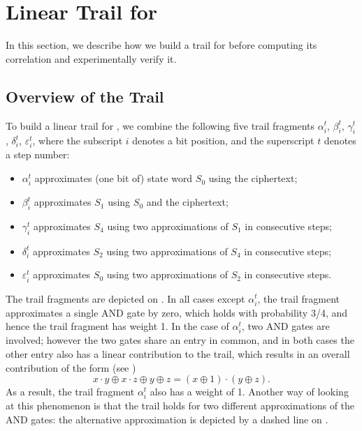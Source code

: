 
\section{Linear Trail for \MiniMORUS}
\label{sec/minitrails}

In this section, we describe how we build a trail for \MiniMORUS before computing its correlation and experimentally verify it.

\subsection{Overview of the Trail}

To build a linear trail for \MiniMORUS, we combine the following five trail fragments $\alpha^t_i$, $\beta^t_i$, $\gamma^t_i$, $\delta^t_i$, $\varepsilon^t_i$, where the subscript $i$ denotes a bit position, and the superscript $t$ denotes a step number:
\begin{itemize}
    \item $\alpha^t_i$ approximates (one bit of) state word $S_0$ using the ciphertext;
    \item $\beta^t_i$ approximates $S_1$ using $S_0$ and the ciphertext;
    \item $\gamma^t_i$ approximates $S_4$ using two approximations of $S_1$ in consecutive steps;
    \item $\delta^t_i$ approximates $S_2$ using two approximations of $S_4$ in consecutive steps;
    \item $\varepsilon^t_i$ approximates $S_0$ using two approximations of $S_2$ in consecutive steps.
\end{itemize}

The trail fragments are depicted on . In all cases except $\alpha^t_i$, the trail fragment approximates a single AND gate by zero, which holds with probability 3/4, and hence the trail fragment has weight 1. In the case of $\alpha^t_i$, two AND gates are involved; however the two gates share an entry in common, and in both cases the other entry also has a linear contribution to the trail, which results in an overall contribution of the form (see \cite[Sec.~3.3]{DBLP:conf/indocrypt/AshurR16})
\[
x \cdot y \oplus x \cdot z \oplus y \oplus z= (x \oplus 1) \cdot (y \oplus z).
\]
As a result, the trail fragment $\alpha^t_i$ also has a weight of 1. Another way of looking at this phenomenon is that the trail holds for two different approximations of the AND gates: the alternative approximation is depicted by a dashed line on .


